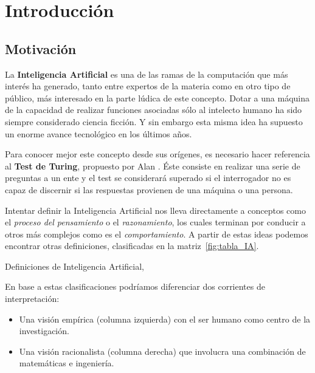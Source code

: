 \chapter{Introducción}
\label{cap:introduccion}



\section{Motivación}

La \textbf{Inteligencia Artificial} es una de las ramas de la computación que más interés ha generado, tanto entre expertos de la materia como en otro tipo de público, más interesado en la parte lúdica de este concepto. Dotar a una máquina de la capacidad de realizar funciones asociadas sólo al intelecto humano ha sido siempre considerado ciencia ficción. Y sin embargo esta misma idea ha supuesto un enorme avance tecnológico en los últimos años.

Para conocer mejor este concepto desde sus orígenes, es necesario hacer referencia al \textbf{Test de Turing}, propuesto por Alan \citet{Turing1950-TURCMA}. Éste consiste en realizar una serie de preguntas a un ente y el test se considerará superado si el interrogador no es capaz de discernir si las respuestas provienen de una máquina o una persona.

Intentar definir la Inteligencia Artificial nos lleva directamente a conceptos como el \textit{proceso del pensamiento} o el \textit{razonamiento}, los cuales terminan por conducir a otros más complejos como es el \textit{comportamiento}. A partir de estas ideas podemos encontrar otras definiciones, clasificadas en la matriz~\ref{fig:tabla_IA}.

%
       {Definiciones de Inteligencia Artificial, \citet{Russell:2009:AIM:1671238}}

En base a estas clasificaciones podríamos diferenciar dos corrientes de interpretación:
\begin{itemize}
    \item Una visión empírica (columna izquierda) con el ser humano como centro de la investigación.
    \item Una visión racionalista (columna derecha) que involucra una combinación de matemáticas e ingeniería.
\end{itemize}


